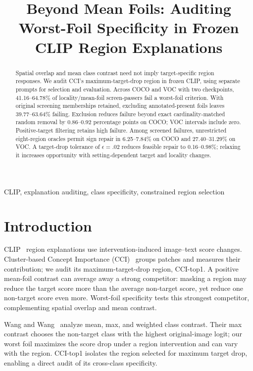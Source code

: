 \documentclass[10pt]{article}
\title{Beyond Mean Foils: Auditing Worst-Foil Specificity in Frozen CLIP Region Explanations}
\begin{document}
\maketitle
\begin{abstract}
Spatial overlap and mean class contrast need not imply target-specific region
responses. We audit CCI's maximum-target-drop region in frozen CLIP, using
separate prompts for selection and evaluation. Across COCO and VOC with two
checkpoints, 41.16--64.78\% of locality/mean-foil screen-passers fail a worst-foil
criterion. With original screening memberships retained, excluding annotated-present
foils leaves 39.77--63.64\% failing. Exclusion reduces failure beyond exact
cardinality-matched random removal by 0.86--0.92 percentage points on COCO;
VOC intervals include zero. Positive-target filtering retains high failure.
Among screened failures, unrestricted eight-region oracles permit sign repair
in 6.25--7.84\% on COCO and 27.40--31.29\% on VOC. A target-drop tolerance
of $\epsilon=.02$ reduces feasible repair to 0.16--0.98\%; relaxing it increases
opportunity with setting-dependent target and locality changes.
\end{abstract}
\begin{keywords}
CLIP, explanation auditing, class specificity, constrained region selection
\end{keywords}

\section{Introduction}
CLIP~\cite{radford2021clip} region explanations use intervention-induced
image--text score changes. Cluster-based Concept Importance
(CCI)~\cite{agarwal2025cci} groups patches and measures their contribution;
we audit its maximum-target-drop region, CCI-top1. A positive mean-foil
contrast can average away a strong competitor: masking a region may reduce
the target score more than the average non-target score, yet reduce one
non-target score even more. Worst-foil specificity tests this strongest
competitor, complementing spatial overlap and mean contrast.

Wang and Wang~\cite{wang2022whynot} analyze mean, max, and weighted
class contrast. Their max contrast chooses the non-target class with the
highest original-image logit; our worst foil maximizes the score drop under
a region intervention and can vary with the region. CCI-top1 isolates the
region selected for maximum target drop, enabling a direct audit of its
cross-class specificity.
\end{document}
